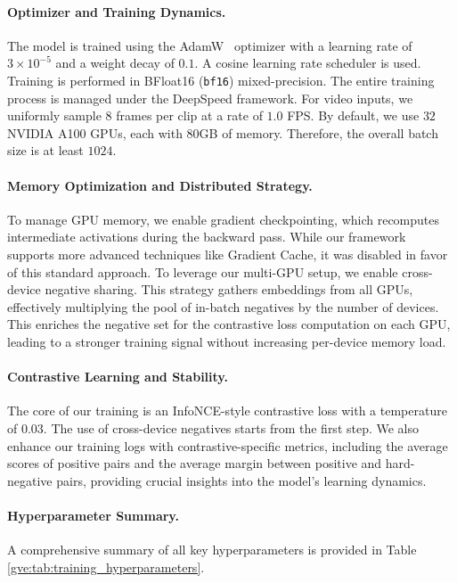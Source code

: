 \paragraph{Optimizer and Training Dynamics.}
The model is trained using the AdamW~\cite{loshchilov2017decoupled} optimizer with a learning rate of \(3 \times 10^{-5}\) and a weight decay of $0.1$. A cosine learning rate scheduler is used. Training is performed in BFloat16 (\texttt{bf16}) mixed-precision. The entire training process is managed under the DeepSpeed framework. For video inputs, we uniformly sample $8$ frames per clip at a rate of $1.0$ FPS. By default, we use $32$ NVIDIA A100 GPUs, each with 80GB of memory. Therefore, the overall batch size is at least $1024$.

\paragraph{Memory Optimization and Distributed Strategy.}
To manage GPU memory, we enable gradient checkpointing, which recomputes intermediate activations during the backward pass. While our framework supports more advanced techniques like Gradient Cache, it was disabled in favor of this standard approach. To leverage our multi-GPU setup, we enable cross-device negative sharing. This strategy gathers embeddings from all GPUs, effectively multiplying the pool of in-batch negatives by the number of devices. This enriches the negative set for the contrastive loss computation on each GPU, leading to a stronger training signal without increasing per-device memory load.

\paragraph{Contrastive Learning and Stability.}
The core of our training is an InfoNCE-style contrastive loss with a temperature of $0.03$. The use of cross-device negatives starts from the first step. We also enhance our training logs with contrastive-specific metrics, including the average scores of positive pairs and the average margin between positive and hard-negative pairs, providing crucial insights into the model's learning dynamics.

\paragraph{Hyperparameter Summary.}
A comprehensive summary of all key hyperparameters is provided in Table \ref{gve:tab:training_hyperparameters}.

